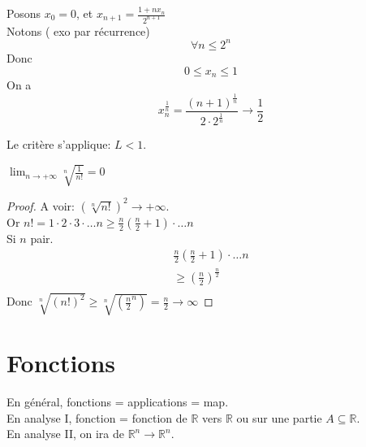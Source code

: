 \documentclass[../main.tex]{subfiles}
\begin{document}
\begin{exemple}
	Posons $x_0 = 0$, et $x_{n+1} = \frac{1+ nx_n}{2^{n+1}}$ \\
	Notons ( exo par récurrence) 
	\[ 
	\forall n \leq 2^{n}
	\]
	Donc 
	\[ 
	0 \leq x_n \leq 1
	\]
	On a 
	\[ 
		x_n ^{\frac{1}{ n}} = \frac{(n+1)^{\frac{1}{n}}}{2\cdot 2^{\frac{1}{n}}} \to \frac{1}{2}
	\]
	
	Le critère s'applique: $L <1$.
	
\end{exemple}
\begin{lemma}
	$\lim_{n \to  + \infty} \sqrt[n]{\frac{1}{n!}} = 0$
\end{lemma}
\begin{proof}
	A voir: $( \sqrt[n]{n!} )^{2} \to + \infty$.\\
	Or $n! = 1 \cdot 2\cdot 3 \cdot \ldots n \geq \frac{n}{2}(\frac{n}{2}+1)\cdot \ldots n$\\
	Si $n$ pair.\\
	
	\begin{align*}
	\frac{n}{2}(\frac{n}{2}+1)\cdot \ldots n\\
	\geq ( \frac{n}{2})^{\frac{n}{2}}\\
	\end{align*}
	Donc $\sqrt[n]{(n!)^{2}} \geq \sqrt[n] { ( \frac{n}{2}^{n})} = \frac{n}{2} \to \infty$
\end{proof}
\section{Fonctions}

En général, fonctions = applications = map.\\


En analyse I, fonction = fonction de $\mathbb{R}$ vers $\mathbb{R}$ ou sur une partie $A \subseteq \mathbb{R}$.\\
En analyse II, on ira de $\mathbb{R}^{n} \to \mathbb{R}^{n}$.







	
\end{document}
